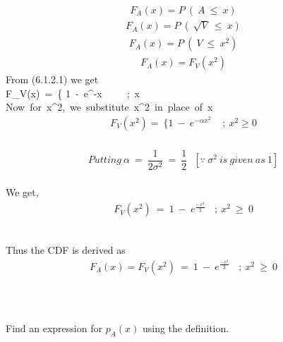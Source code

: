 \documentclass[journal,12pt,twocolumn]{IEEEtran}
\begin{document}
\begin{align} F_A(x) = P\ (\ A\ \leq\ x)\end{align}
\begin{align} F_A(x) = P\ (\ \sqrt{V}\ \leq\ x)\end{align}
\begin{align} F_A(x) = P\ (\ V\ \leq\ x^2)\end{align}
\begin{align} F_A(x) = F_V(x^2)\end{align}
From (6.1.2.1) we get\\

F_V(x)\ =\ \Bigg\{ 1\ -\ e^{-\alpha x}\ \ \ \ \ ;\ x \\

Now\ for\ x^2,\ we\ substitute\ x^2\ in\ place\ of\ x\\

\begin{align}F_V(x^2) = \ \Bigg\{ 1\ -\ e^{-\alpha x^2}\ \ \ \ \ ;\ x^2 \geq 0\end{align}\\


\begin{align*}Putting\ \alpha\ =\ \dfrac{1}{2\sigma^2}\ =\ \dfrac{1}{2}\ \ \ [\because \ \sigma^2\ is\ given\ as\ 1]\end{align*}\\
We get,\\
\begin{align} F_V(x^2)\ =\ 1\ -\ e^\frac{-x^2}{2}\ \ \ \ ;\ x^2\ \geq\ 0\end{align}\\

\begin{mdframed}
Thus the CDF  is derived as\\
\begin{align*} F_A(x) =  F_V(x^2)\ =\ 1\ -\ e^\frac{-x^2}{2}\ \ \ \ ;\ x^2\ \geq\ 0\end{align*}
\end{mdframed}\\

\subsection*{}
Find an expression for $p_A(x)$ using the definition.

\subsection*{}\\
\end{document}
